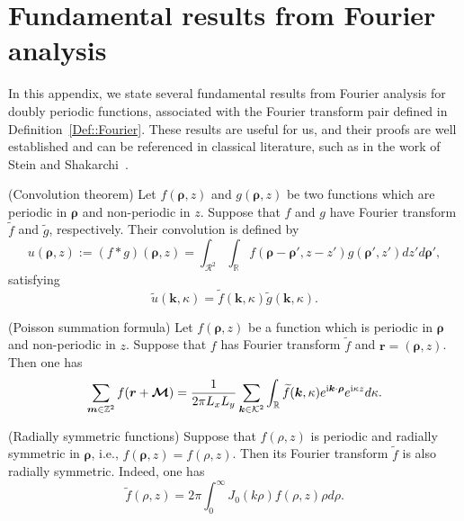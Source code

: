 \section{Fundamental results from Fourier analysis} \label{app::Fourier}
In this appendix, we state several fundamental results from Fourier analysis for doubly periodic functions, associated with the Fourier transform pair defined in Definition~\ref{Def::Fourier}. These results are useful for us, and their proofs are well established and can be referenced in classical literature, such as in the work of Stein and Shakarchi~\cite{stein2011fourier}.
\begin{lem}\label{lem::Convolution}
	(Convolution theorem) Let $f(\bm{\rho},z)$ and $g(\bm{\rho},z)$ be two functions which are periodic in $\bm{\rho}$ and non-periodic in $z$. Suppose that $f$ and $g$ have Fourier transform $\widetilde{f}$ and $\widetilde{g}$, respectively. Their convolution is defined by
	\begin{equation}\label{eq:Q2D_cov}
		u(\bm{\rho},z):=(f\ast g)(\bm{\rho},z)=\int_{\mathcal{R}^2}\int_{\mathbb{R}}f(\bm{\rho}-\bm{\rho}',z-z')g(\bm{\rho}',z')dz'd\bm{\rho}',
	\end{equation}
	satisfying
	\begin{equation}
		\widetilde{u}(\bm{k},\kappa)=\widetilde{f}(\bm{k},\kappa)\widetilde{g}(\bm{k},\kappa).
	\end{equation}
	
\end{lem}
\begin{lem}\label{lem::Poisson}
	(Poisson summation formula) Let $f(\bm{\rho},z)$ be a function which is periodic in $\bm{\rho}$ and non-periodic in $z$. Suppose that $f$ has Fourier transform $\widetilde{f}$ and $\bm{r}=(\bm{\rho},z)$. Then one has
	\begin{equation}
		\sum_{\bm{m}\in \mathbb{Z}^2} f(\bm{r} + \boldsymbol{\mathcal{M}}) = \frac{1}{2\pi L_x L_y}\sum_{\bm{k}\in \mathcal{K}^2}\int_{\mathbb{R}}\widetilde{f}(\bm{k},\kappa)e^{\mathrm{i} \bm{k}\cdot\bm{\rho}}e^{\mathrm{i} \kappa z}d\kappa.
	\end{equation}
\end{lem}
\begin{lem}\label{lem::2dfourier}
	(Radially symmetric functions) 
	Suppose that $f(\rho,z)$ is periodic and radially symmetric in $\bm{\rho}$, i.e., $f(\bm{\rho},z)=f(\rho,z)$. Then its Fourier transform $\widetilde{f}$ is also radially symmetric. Indeed, one has
	\begin{equation}
		\widetilde{f}(\rho,z)=2\pi\int_{0}^{\infty}J_0(k\rho)f(\rho,z)\rho d\rho.
	\end{equation}
\end{lem}

